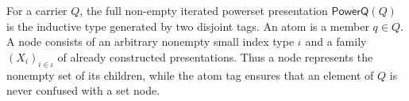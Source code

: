 \begin{definition}
For a carrier $Q$, the full non-empty iterated powerset presentation
$\mathsf{PowerQ}(Q)$ is the inductive type generated by two disjoint tags.
An atom is a member $q\in Q$.  A node consists of an arbitrary nonempty
small index type $\iota$ and a family
$(X_i)_{i\in\iota}$ of already constructed presentations.  Thus a node
represents the nonempty set of its children, while the atom tag ensures that
an element of $Q$ is never confused with a set node.
\end{definition}
